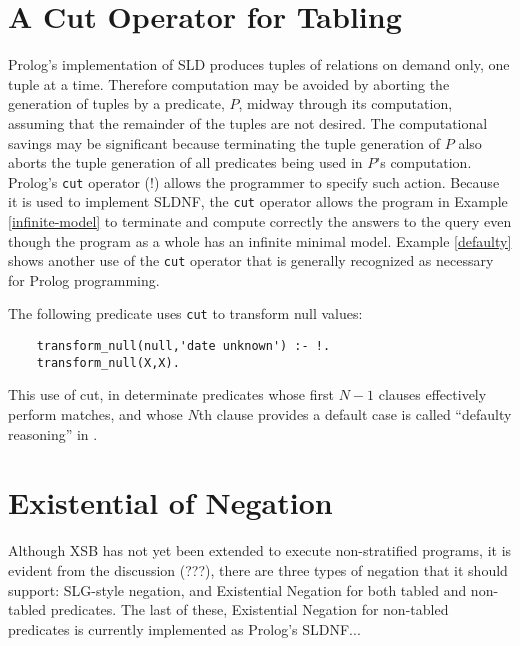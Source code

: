 \section{A Cut Operator for Tabling} \label{slgo-cuts}

Prolog's implementation of SLD produces tuples of relations on demand
only, one tuple at a time.  Therefore computation may be avoided by
aborting the generation of tuples by a predicate, $P$, midway through
its computation, assuming that the remainder of the tuples are not
desired. The computational savings may be significant because
terminating the tuple generation of $P$ also aborts the tuple
generation of all predicates being used in $P$'s computation.
Prolog's {\tt cut} operator ({!}) allows the programmer to specify
such action.  Because it is used to implement SLDNF, the {\tt cut}
operator allows the program in Example \ref{infinite-model} to
terminate and compute correctly the answers to the query even though
the program as a whole has an infinite minimal model.  Example \ref{defaulty}
shows another use of the {\tt cut} operator that is generally
recognized as necessary for Prolog programming.


\begin{example} \rm \label{defaulty}
The following predicate uses {\tt cut} to transform null values:
\begin{verbatim}
    transform_null(null,'date unknown') :- !.
    transform_null(X,X).
\end{verbatim}
This use of cut, in determinate predicates whose first $N-1$ clauses 
effectively perform matches, and whose $N$th clause provides a default
case is called ``defaulty reasoning'' in \cite{OKE90}.
\end{example}

\section{Existential of Negation} \label{SLG-SLDNF}

Although XSB has not yet been extended to execute non-stratified
programs, it is evident from the discussion (???), there are three
types of negation that it should support: SLG-style negation, and
Existential Negation for both tabled and non-tabled predicates.  The
last of these, Existential Negation for non-tabled predicates is
currently implemented as Prolog's SLDNF...


